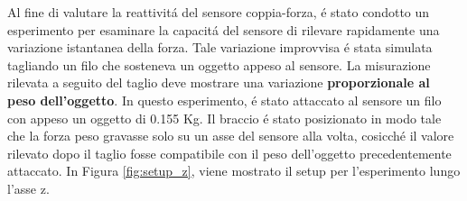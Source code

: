 Al fine di valutare la reattivit\'{a} del sensore coppia-forza, \'{e} stato condotto un esperimento per esaminare la capacit\'{a} del 
sensore di rilevare rapidamente una variazione istantanea della forza. 
Tale variazione improvvisa \'{e} stata simulata 
tagliando un filo che sosteneva un oggetto appeso al sensore. La misurazione rilevata a seguito del taglio  
deve mostrare una variazione \textbf{proporzionale al peso dell'oggetto}.
In questo esperimento, \'{e} stato attaccato al sensore un filo con appeso un oggetto di 0.155 Kg. 
Il braccio \'{e} stato posizionato in modo tale che la forza peso gravasse solo su un asse del sensore alla volta, cosicch\'{e} 
il valore rilevato dopo il taglio fosse compatibile con il peso dell'oggetto precedentemente attaccato. 
In Figura \ref{fig:setup_z}, viene mostrato il setup per l'esperimento lungo l'asse z. 
\newpage
